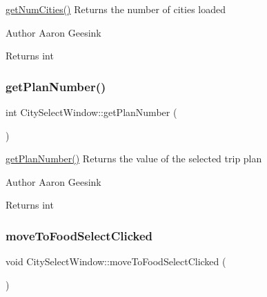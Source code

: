 \mbox{\hyperlink{class_city_select_window_a2bee3e628f1249dd6fa5cabc08d63f43}{get\+Num\+Cities()}} Returns the number of cities loaded 

\begin{DoxyAuthor}{Author}
Aaron Geesink 
\end{DoxyAuthor}
\begin{DoxyReturn}{Returns}
int 
\end{DoxyReturn}
\mbox{\label{class_city_select_window_a63048482e621b1653250c7acbd28c3aa}} 
\subsubsection{\texorpdfstring{getPlanNumber()}{getPlanNumber()}}
{\footnotesize\ttfamily int City\+Select\+Window\+::get\+Plan\+Number (\begin{DoxyParamCaption}{ }\end{DoxyParamCaption})}



\mbox{\hyperlink{class_city_select_window_a63048482e621b1653250c7acbd28c3aa}{get\+Plan\+Number()}} Returns the value of the selected trip plan 

\begin{DoxyAuthor}{Author}
Aaron Geesink 
\end{DoxyAuthor}
\begin{DoxyReturn}{Returns}
int 
\end{DoxyReturn}
\mbox{\label{class_city_select_window_a6181200e04334e668f39df57af243fff}} 
\subsubsection{\texorpdfstring{moveToFoodSelectClicked}{moveToFoodSelectClicked}}
{\footnotesize\ttfamily void City\+Select\+Window\+::move\+To\+Food\+Select\+Clicked (\begin{DoxyParamCaption}{ }\end{DoxyParamCaption})\hspace{0.3cm}{\ttfamily [signal]}}



